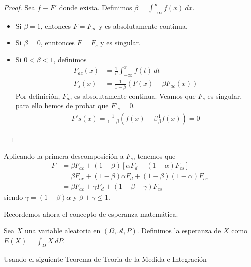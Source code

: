 \begin{proof}
    Sea $f \equiv F'$ donde exista. Definimos $\beta = \int_{-\infty}^{\infty} f(x) \ dx$.
    \begin{itemize}
        \item Si $\beta = 1$, entonces $F = F_{ac}$ y es absolutamente continua.
        \item Si $\beta = 0$, enntonces $F = F_s$ y es singular.
        \item Si $0 < \beta < 1$, definimos
              \begin{align*}
                  F_{ac}(x) & = \frac{1}{\beta} \int_{-\infty}^{x} f(t) \ dt \\
                  F_s(x)    & = \frac{1}{1-\beta}(F(x) - \beta F_{ac}(x))
              \end{align*}
              Por definición, $F_{ac}$ es absolutamente continua. Veamos que $F_s$ es singular, para ello hemos de probar que $F'_s = 0$.
              \begin{align*}
                  F's(x) = \frac{1}{1-\beta}\left(f(x) - \beta \frac{1}{\beta} f(x)\right) = 0
              \end{align*}
    \end{itemize}
\end{proof}

\begin{obs}
    Aplicando la primera descomposición a $F_s$, tenemos que
    \begin{align*}
        F & = \beta F_{ac} + (1-\beta)[\alpha F_d + (1-\alpha)F_{cs}]        \\
          & = \beta F_{ac} + (1-\beta)\alpha F_d + (1-\beta)(1-\alpha)F_{cs} \\
          & = \beta F_{ac} + \gamma F_d + (1-\beta-\gamma)F_{cs}
    \end{align*}
    siendo $\gamma = (1-\beta)\alpha$ y $\beta + \gamma \leq 1$.
\end{obs}

Recordemos ahora el concepto de esperanza matemática.

\begin{defi}
    Sea $X$ una variable aleatoria en $(\Omega, \mathcal{A}, P)$. Definimos la esperanza de $X$ como $E(X) = \int_{\Omega} X \ dP$.
\end{defi}

Usando el siguiente Teorema de Teoria de la Medida e Integración

